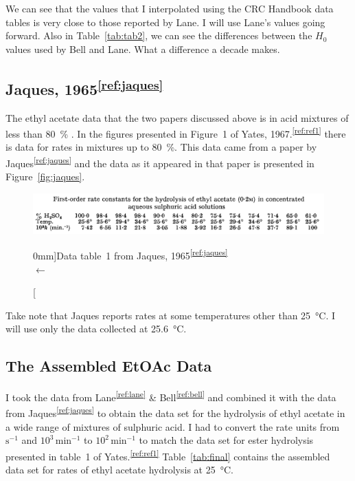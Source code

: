 \documentclass[]{tufte-handout}
\newcommand{\tss}[1]{\textsuperscript{#1}}
\begin{document}
We can see that the values that I interpolated using the CRC Handbook data tables is very close to those reported by Lane. I will use Lane's values going forward. Also in Table~\ref{tab:tab2}, we can see the differences between the $H_0$ values used by Bell and Lane. What a difference a decade makes.



\clearpage
\subsection{Jaques, 1965\tss{\ref{ref:jaques}}}

The ethyl acetate data that the two papers discussed above is in acid mixtures of less than \qty{80}{\percent} . In the figures presented in Figure~1 of Yates, 1967.\tss{\ref{ref:ref1}} there is data for rates in mixtures up to \qty{80}{\percent}. This data came from a paper by Jaques\tss{\ref{ref:jaques}} and the data as it appeared in that paper is presented in Figure~\vref{fig:jaques}. 

\begin{figure}[h!]
\vspace{0mm}
  \centering
  \includegraphics[scale=0.18]{images/jaquestable} 
  \caption[][0mm]{Data table~1 from Jaques, 1965\tss{\ref{ref:jaques}}  \\  $\longleftarrow$ \vspace{3mm}}

  \label{fig:jaques}
\end{figure}

Take note that Jaques reports rates at some temperatures other than \qty{25}{\degreeCelsius}. I will use only the data collected at \qty{25.6}{\degreeCelsius}.


\subsection{The Assembled EtOAc Data}

I took the data from Lane\tss{\ref{ref:lane}} \& Bell\tss{\ref{ref:bell}} and combined it with the data from Jaques\tss{\ref{ref:jaques}} to obtain the data set for the hydrolysis of ethyl acetate in a wide range of mixtures of sulphuric acid. I had to convert the rate units from $\text{s}^{-1}$ and $10^3\,\text{min}^{-1}$ to $10^2\,\text{min}^{-1}$ to match the data set for ester hydrolysis presented in table~1 of Yates.\tss{\ref{ref:ref1}} Table~\vref{tab:final} contains the assembled data set for rates of ethyl acetate hydrolysis at \qty{25}{\degreeCelsius}.
\end{document}
